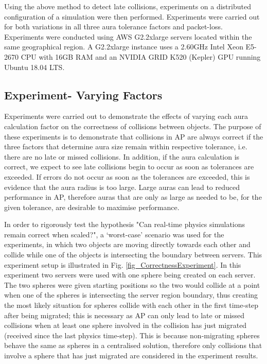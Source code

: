 Using the above method to detect late collisions, experiments on a distributed configuration of a simulation were then performed. Experiments were carried out for both variations in all three aura tolerance factors and packet-loss. Experiments were conducted using AWS G2.2xlarge servers located within the same geographical region. A G2.2xlarge instance uses a 2.60GHz Intel Xeon E5-2670 CPU with 16GB RAM and an NVIDIA GRID K520 (Kepler) GPU running Ubuntu 18.04 LTS.

\subsection{Experiment- Varying Factors}
Experiments were carried out to demonstrate the effects of varying each aura calculation factor on the correctness of collisions between objects. The purpose of these experiments is to demonstrate that collisions in AP are always correct if the three factors that determine aura size remain within respective tolerance, i.e. there are no late or missed collisions. In addition, if the aura calculation is correct, we expect to see late collisions begin to occur as soon as tolerances are exceeded. If errors do not occur as soon as the tolerances are exceeded, this is evidence that the aura radius is too large. Large auras can lead to reduced performance in AP, therefore auras that are only as large as needed to be, for the given tolerance, are desirable to maximise performance.

In order to rigorously test the hypothesis "Can real-time physics simulations remain correct when scaled?", a `worst-case' scenario was used for the experiments, in which two objects are moving directly towards each other and collide while one of the objects is intersecting the boundary between servers. This experiment setup is illustrated in Fig. \ref{fig_CorrectnessExperiment}. In this experiment two servers were used with one sphere being created on each server. The two spheres were given starting positions so the two would collide at a point when one of the spheres is intersecting the server region boundary, thus creating the most likely situation for spheres collide with each other in the first time-step after being migrated; this is necessary as AP can only lead to late or missed collisions when at least one sphere involved in the collision has just migrated (received since the last physics time-step). This is because non-migrating spheres behave the same as spheres in a centralised solution, therefore only collisions that involve a sphere that has just migrated are considered in the experiment results.

